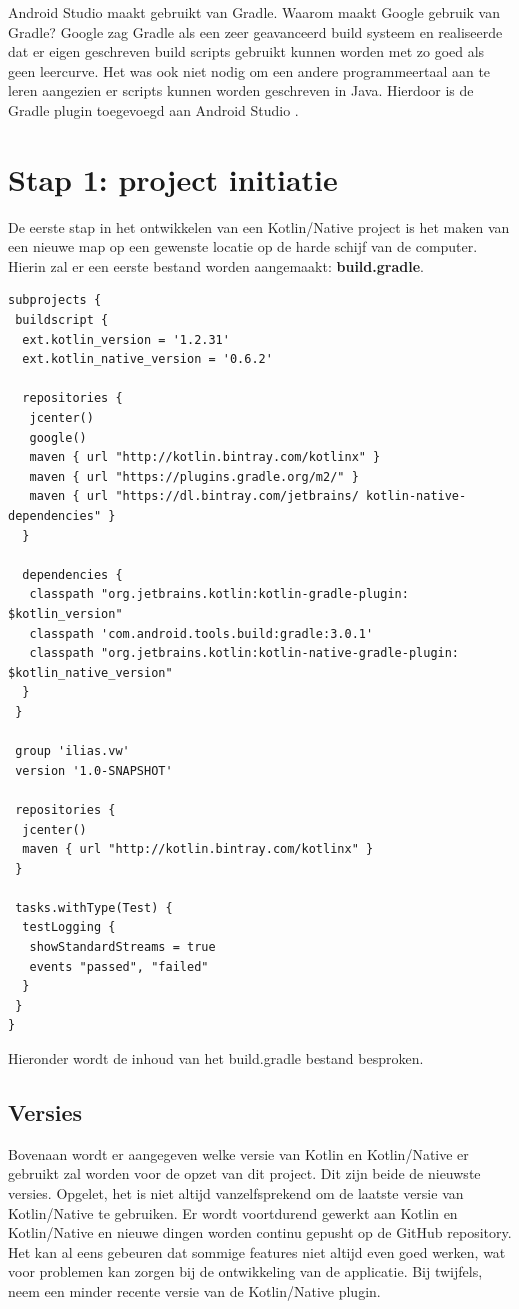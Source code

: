 Android Studio maakt gebruikt van Gradle. Waarom maakt Google gebruik van Gradle? Google zag Gradle als een zeer geavanceerd build systeem en realiseerde dat er eigen geschreven build scripts gebruikt kunnen worden met zo goed als geen leercurve. Het was ook niet nodig om een andere programmeertaal aan te leren aangezien er scripts kunnen worden geschreven in Java. Hierdoor is de Gradle plugin toegevoegd aan Android Studio \autocite{GoogleGradle}.

\section{Stap 1: project initiatie}
De eerste stap in het ontwikkelen van een Kotlin/Native project is het maken van een nieuwe map op een gewenste locatie op de harde schijf van de computer. Hierin zal er een eerste bestand worden aangemaakt: \textbf{build.gradle}.

\begin{lstlisting}
subprojects {
 buildscript {
  ext.kotlin_version = '1.2.31'
  ext.kotlin_native_version = '0.6.2'
		
  repositories {
   jcenter()
   google()
   maven { url "http://kotlin.bintray.com/kotlinx" }
   maven { url "https://plugins.gradle.org/m2/" }
   maven { url "https://dl.bintray.com/jetbrains/ kotlin-native-dependencies" }
  }

  dependencies {
   classpath "org.jetbrains.kotlin:kotlin-gradle-plugin: $kotlin_version"
   classpath 'com.android.tools.build:gradle:3.0.1'
   classpath "org.jetbrains.kotlin:kotlin-native-gradle-plugin: $kotlin_native_version"
  }
 }
	
 group 'ilias.vw'
 version '1.0-SNAPSHOT'
	
 repositories {
  jcenter()
  maven { url "http://kotlin.bintray.com/kotlinx" }
 }
	
 tasks.withType(Test) {
  testLogging {
   showStandardStreams = true
   events "passed", "failed"
  }
 }
}
\end{lstlisting}
Hieronder wordt de inhoud van het build.gradle bestand besproken.
\subsection{Versies}
Bovenaan wordt er aangegeven welke versie van Kotlin en Kotlin/Native er gebruikt zal worden voor de opzet van dit project. Dit zijn beide de nieuwste versies. Opgelet, het is niet altijd vanzelfsprekend om de laatste versie van Kotlin/Native te gebruiken. Er wordt voortdurend gewerkt aan Kotlin en Kotlin/Native en nieuwe dingen worden continu gepusht op de GitHub repository. Het kan al eens gebeuren dat sommige features niet altijd even goed werken, wat voor problemen kan zorgen bij de ontwikkeling van de applicatie. Bij twijfels, neem een minder recente versie van de Kotlin/Native plugin.

